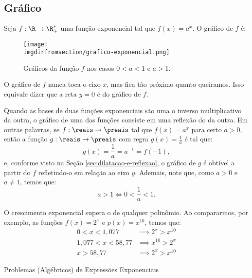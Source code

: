 \subsection{Gráfico}

\begin{example}
    Seja $f: \R \to \R_+^*$ uma função exponencial tal que $f(x) =
a^x$. O gráfico de $f$ é:

\begin{figure}[H]
    \centering
    \texttt{[image: \\imgdirfromsection/grafico-exponencial.png]}
    \caption{Gráficos da função $f$ nos casos $0<a<1$ e $a>1$.}
    \label{img:grafico-exponencial}
\end{figure}

O gráfico de $f$ nunca toca o eixo $x$, mas fica tão próximo quanto
queiramos. Isso equivale dizer que a reta $y=0$ é  do
gráfico de $f$.
\end{example}

\begin{remark}
    Quando as bases de duas funções exponenciais são uma o inverso multiplicativo da outra, o gráfico de uma 
    das funções consiste em uma reflexão do da outra. Em outras palavras, se $f:\reais \to \preais$
    tal que $f(x) = a^x $ para certo $a > 0$, então a função $g:\reais \to \preais$ com regra 
    $g(x) = \frac 1 a$ é tal que:
    \[
        g(x) = \frac 1 a = a^{-1} = f(-1),    
    \]
    e, conforme visto na Seção \ref{sec:dilatacao-e-reflexao}, o gráfico de $g$ é obtível a partir do $f$ refletindo-o em relação ao eixo
    $y$. Ademais, note que, como $a > 0$ e $a \ne 1$, temos que:
    $$a > 1 \iff 0 < \frac{1}{a} < 1.$$
\end{remark}

\begin{example}
    O crescimento exponencial supera o de qualquer polinômio. Ao compararmos, por exemplo, as funções $f(x) = 2^x$ e $p(x)=x^{10}$, temos que:
    \begin{align*}
        0<x<1{,}077 & \implies  2^x > x^{10} \\
        1{,}077 < x < 58{,}77 & \implies  x^{10} > 2^x \\
        x>58{,}77 & \implies  2^x > x^{10}
    \end{align*}
\end{example}

\begin{onlineact}
    {Problemas (Algébricos) de Expressões Exponenciais}
\end{onlineact}

